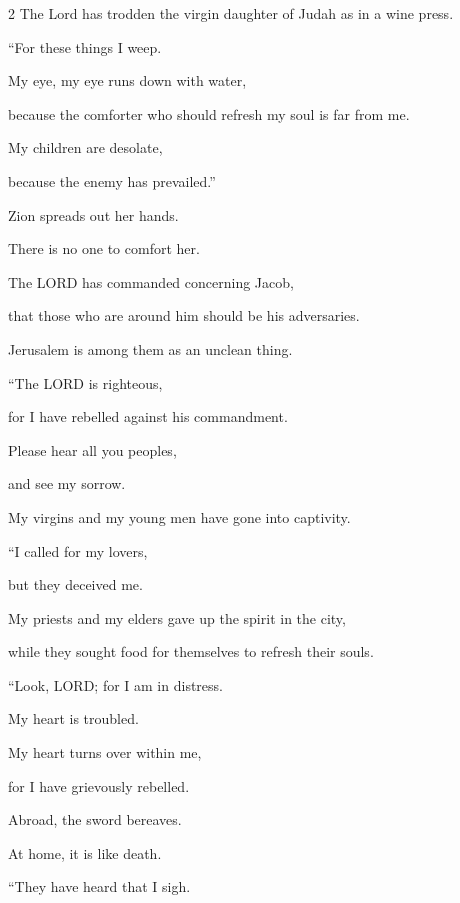 \begin{multicols}{2}
	The Lord has trodden the virgin daughter of Judah as in a wine press.
	\vspace{\baselineskip}
	
	\myverse{}“For these things I weep.
	
	My eye, my eye runs down with water,
	
	because the comforter who should refresh my soul is far from me.
	
	My children are desolate,
	
	because the enemy has prevailed.”
	\vspace{\baselineskip}
	
	\myverse{}Zion spreads out her hands.
	
	There is no one to comfort her.
	
	The LORD has commanded concerning Jacob,
	
	that those who are around him should be his adversaries.
	
	Jerusalem is among them as an unclean thing.
	\vspace{\baselineskip}
	
	\myverse{}“The LORD is righteous,
	
	for I have rebelled against his commandment.
	
	Please hear all you peoples,
	
	and see my sorrow.
	
	My virgins and my young men have gone into captivity.
	\vspace{\baselineskip}
	
	\myverse{}“I called for my lovers,
	
	but they deceived me.
	
	My priests and my elders gave up the spirit in the city,
	
	while they sought food for themselves to refresh their souls.
	\vspace{\baselineskip}
	
	\myverse{}“Look, LORD; for I am in distress.
	
	My heart is troubled.
	
	My heart turns over within me,
	
	for I have grievously rebelled.
	
	Abroad, the sword bereaves.
	
	At home, it is like death.
	\vspace{\baselineskip}
	
	\myverse{}“They have heard that I sigh.
	

\end{multicols}
